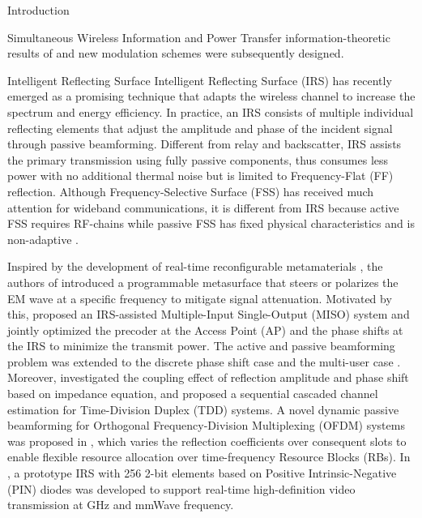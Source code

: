 \documentclass[journal]{IEEEtran}
\begin{document}
\begin{section}{Introduction}
\begin{subsection}{Simultaneous Wireless Information and Power Transfer}
information-theoretic results of \cite{Varasteh2020} and new modulation schemes were subsequently designed.
		\end{subsection}


		\begin{subsection}{Intelligent Reflecting Surface}
			Intelligent Reflecting Surface (IRS) has recently emerged as a promising technique that adapts the wireless channel to increase the spectrum and energy efficiency. In practice, an IRS consists of multiple individual reflecting elements that adjust the amplitude and phase of the incident signal through passive beamforming. Different from relay and backscatter, IRS assists the primary transmission using fully passive components, thus consumes less power with no additional thermal noise but is limited to Frequency-Flat (FF) reflection. Although Frequency-Selective Surface (FSS) has received much attention for wideband communications, it is different from IRS because active FSS requires RF-chains \cite{Kim2006} while passive FSS has fixed physical characteristics and is non-adaptive \cite{Anwar2018}.

			Inspired by the development of real-time reconfigurable metamaterials \cite{Cui2014}, the authors of \cite{Liaskos2018} introduced a programmable metasurface that steers or polarizes the EM wave at a specific frequency to mitigate signal attenuation. Motivated by this, \cite{Wu2018} proposed an IRS-assisted Multiple-Input Single-Output (MISO) system and jointly optimized the precoder at the Access Point (AP) and the phase shifts at the IRS to minimize the transmit power. The active and passive beamforming problem was extended to the discrete phase shift case \cite{Wu2019a} and the multi-user case \cite{Wu2019}. Moreover, \cite{Abeywickrama2019} investigated the coupling effect of reflection amplitude and phase shift based on impedance equation, and \cite{Nadeem2019} proposed a sequential cascaded channel estimation for Time-Division Duplex (TDD) systems. %
			A novel dynamic passive beamforming for Orthogonal Frequency-Division Multiplexing (OFDM) systems was proposed in \cite{Yang2020}, which varies the reflection coefficients over consequent slots to enable flexible resource allocation over time-frequency Resource Blocks (RBs). In \cite{Dai2020}, a prototype IRS with \num{256} \num{2}-bit elements based on Positive Intrinsic-Negative (PIN) diodes was developed to support real-time high-definition video transmission at \si{GHz} and mmWave frequency.
		\end{subsection}



\end{section}
\end{document}
